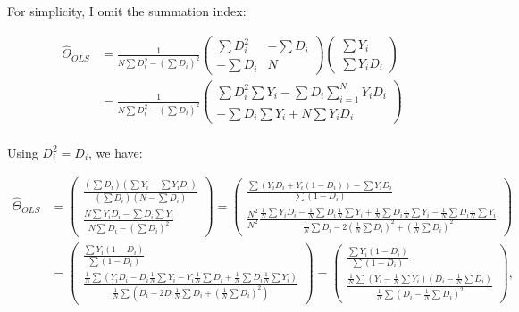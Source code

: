 \documentclass[]{book}
\theoremstyle{definition}
\theoremstyle{definition}
\theoremstyle{definition}
\theoremstyle{remark}
\begin{document}
For simplicity, I omit the summation index:

\begin{align*}
  \hat{\Theta}_{OLS} &  = \frac{1}{N\sum D_i^2-\left(\sum D_i\right)^2}
                          \left(\begin{array}{cc} \sum D_i^2 & -\sum D_i \\ -\sum D_i & N \end{array}\right)
                          \left(\begin{array}{c} \sum Y_i \\  \sum Y_iD_i \end{array}\right) \\
                    & = \frac{1}{N\sum D_i^2-\left(\sum D_i\right)^2}
                        \left(\begin{array}{c} \sum D_i^2\sum Y_i-\sum D_i\sum_{i=1}^NY_iD_i \\
                                              -\sum D_i\sum Y_i+ N\sum Y_iD_i \end{array}\right) \\
\end{align*}

Using \(D_i^2=D_i\), we have:

\begin{align*}
  \hat{\Theta}_{OLS} &  =  \left(\begin{array}{c} 
          \frac{\left(\sum D_i\right)\left(\sum Y_i-\sum Y_iD_i\right)}{\left(\sum D_i\right)\left(N-\sum D_i\right)} \\
          \frac{N\sum Y_iD_i-\sum D_i\sum Y_i}{N\sum D_i-\left(\sum D_i\right)^2} 
                            \end{array}\right) 
                        =     \left(\begin{array}{c} 
          \frac{\sum (Y_iD_i+Y_i(1-D_i))-\sum Y_iD_i}{\sum(1-D_i)} \\
          \frac{N^2}{N^2}\frac{\frac{1}{N}\sum Y_iD_i-\frac{1}{N}\sum D_i\frac{1}{N}\sum Y_i+\frac{1}{N}\sum D_i\frac{1}{N}\sum Y_i-\frac{1}{N}\sum D_i\frac{1}{N}\sum Y_i}{\frac{1}{N}\sum D_i-2\left(\frac{1}{N}\sum D_i\right)^2+\left(\frac{1}{N}\sum D_i\right)^2} 
                            \end{array}\right) \\
                      &  =     \left(\begin{array}{c} 
          \frac{\sum Y_i(1-D_i)}{\sum(1-D_i)} \\
          \frac{\frac{1}{N}\sum \left(Y_iD_i-D_i\frac{1}{N}\sum Y_i-Y_i\frac{1}{N}\sum D_i+\frac{1}{N}\sum D_i\frac{1}{N}\sum Y_i\right)}{\frac{1}{N}\sum\left(D_i-2D_i\frac{1}{N}\sum D_i+\left(\frac{1}{N}\sum D_i\right)^2\right)} 
                            \end{array}\right) 
                      =     \left(\begin{array}{c} 
          \frac{\sum Y_i(1-D_i)}{\sum(1-D_i)} \\
    \frac{\frac{1}{N}\sum\left(Y_i-\frac{1}{N}\sum Y_i\right)\left(D_i-\frac{1}{N}\sum D_i\right)}{\frac{1}{N}\sum \left(D_i-\frac{1}{N}\sum D_i\right)^2} 
                            \end{array}\right), 
\end{align*}
\end{document}
